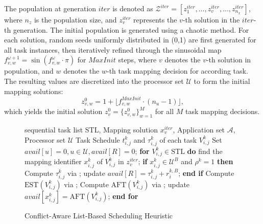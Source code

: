 \documentclass{IEEEtaes}
\makeatletter
\newcommand{\removelatexerror}{\let\@latex@error\@gobble}
\makeatother
\begin{document}
The population at generation $iter$ is denoted as $\mathcal{Z}^{iter}=[z^{iter}_{1},\dots,z^{iter}_{v},\dots,z^{iter}_{n_x}]$, where ${n_z}$ is the population size, and $z^{iter}_{v}$ represents the $v$-th solution in the $iter$-th generation. The initial population is generated using a chaotic method. For each solution, random seeds uniformly distributed in (0,1) are first generated for all task instances, then iteratively refined through the sinusoidal map $f^{\omega+1}_{v,w}=\sin (f^{\omega}_{v,w}\cdot\pi)$ for $MaxInit$ steps, where $v$ denotes the $v$-th solution in population, and $w$ denotes the $w$-th task mapping decision for according task. The resulting values are discretized into the processor set $\mathcal{U}$ to form the initial mapping solutions:
\begin{equation}
    z^{0}_{v,w}=1+\lfloor f^{MaxInit}_{v,w}\cdot(n_u-1)\rfloor,
\end{equation}
which yields the initial solution $z^{0}_{v} = \{z^{0}_{v,w}\}_{w=1}^M$ for all $M$ task mapping decisions.

\begin{figure}[!t]
\renewcommand{\algorithmicrequire}{\textbf{Input:}}
\renewcommand{\algorithmicensure}{\textbf{Output:}}
\removelatexerror
\begin{algorithm}[H]
    \caption{Conflict-Aware List-Based Scheduling Heuristic}
    \begin{algorithmic}[1]
        \REQUIRE sequential task list STL, Mapping solution $x^{iter}_{v}$, Application set $\mathcal{A}$, Processor set $\mathcal{U}$         %
        \ENSURE Task Schedule $t_{i,j}^k$ and $\tau_{i,j}^k$ of each task $V_{i,j}^{k}$  %
        \STATE Set $avail[u]=0,u\in \mathcal{U},avail[R]=0$;
        \STATE \textbf{for} $V_{i,j}^{k}\in \text{STL}$ \textbf{do}
        \STATE \quad find the mapping identifier $x_{i,j}^{k}$ of $V_{i,j}^{k}$ in $z^{iter}_{v}$;
        \STATE \quad \textbf{if} $x_{i,j}^{k}\in \mathcal{U}^B$ and $\rho^k=1$ \textbf{then}
        \label{alg1:sche start}
        \STATE\quad\quad Compute $\tau_{i,j}^k$ via ;
        \STATE \quad\quad update $avail[R]=\tau_{i,j}^{k}+r_{i}^{k,B}$;
        \STATE \quad\textbf{end if}
        \STATE\quad Compute $\text{EST}(V_{i,j}^{k})$ via ;
        \STATE\quad Compute $\text{AFT}(V_{i,j}^{k})$ via ;
        \STATE \quad update $avail[x_{i,j}^{k}]=\text{AFT}(V_{i,j}^{k})$;
        \label{alg1:sche end}
        \STATE \textbf{end for}
    \end{algorithmic}
    \label{alg:CLSH}
\end{algorithm}
\end{figure}
\end{document}
